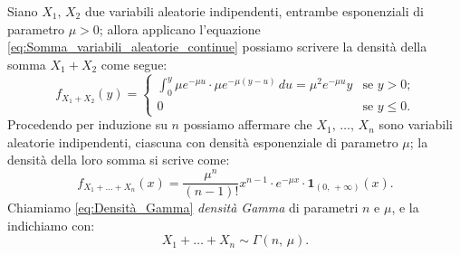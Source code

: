         \begin{defn}\label{defn:Densità_Gamma}
            Siano $X_1,\, X_2$ due variabili aleatorie indipendenti, entrambe esponenziali di parametro $\mu > 0$; allora applicano l'equazione \eqref{eq:Somma_variabili_aleatorie_continue} possiamo scrivere la densità della somma $X_1+X_2$ come segue: \[
                f_{X_1+X_2}(y) = \begin{cases}
                    \int_{0}^{y} \mu e^{-\mu u} \cdot \mu e^{-\mu(y-u)}\, du = \mu^2 e^{-\mu u} y & \text{se $y > 0$;} \\
                    0 & \text{se $y \leq 0$.}
                \end{cases}
            \] Procedendo per induzione su $n$ possiamo affermare che $X_1,\, \ldots,\, X_{n}$ sono variabili aleatorie indipendenti, ciascuna con densità esponenziale di parametro $\mu$; la densità della loro somma si scrive come:
            \begin{equation}\label{eq:Densità_Gamma}
                f_{X_1+\ldots+X_n}(x) = \frac{\mu^n}{(n-1)!}x^{n-1} \cdot 
                e^{-\mu x} \cdot \mathbf{1}_{(0,\,+\infty)}(x)
            .\end{equation}
            Chiamiamo \eqref{eq:Densità_Gamma} \textit{densità Gamma} di parametri $n$ e $\mu$, e la indichiamo con: \[
                X_1 + \ldots + X_{n} \sim \Gamma(n,\, \mu)
            .\]
        \end{defn}
